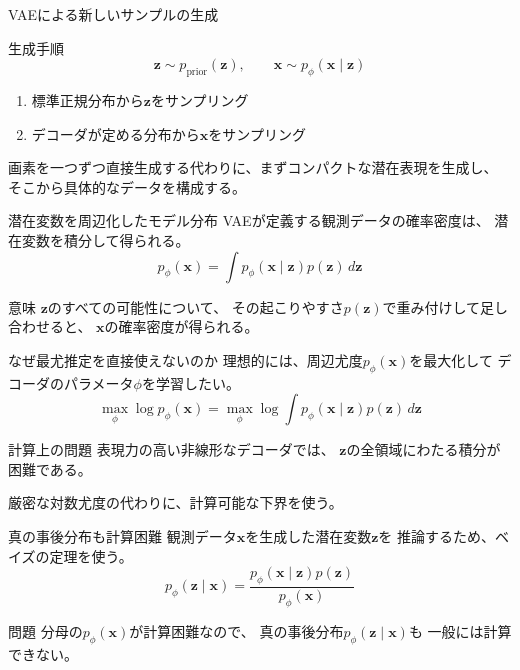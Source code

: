 \begin{frame}{VAEによる新しいサンプルの生成}
    \begin{block}{生成手順}
        \[
            \boldsymbol{z}\sim p_{\mathrm{prior}}(\boldsymbol{z}),
            \qquad
            \boldsymbol{x}\sim p_\phi(\boldsymbol{x}\mid\boldsymbol{z})
        \]
        \begin{enumerate}
            \item 標準正規分布から$\boldsymbol{z}$をサンプリング
            \item デコーダが定める分布から$\boldsymbol{x}$をサンプリング
        \end{enumerate}
    \end{block}
    \vspace{0.5em}
    画素を一つずつ直接生成する代わりに、まずコンパクトな潜在表現を生成し、
    そこから具体的なデータを構成する。
\end{frame}
\begin{frame}{潜在変数を周辺化したモデル分布}
    VAEが定義する観測データの確率密度は、
    潜在変数を積分して得られる。
    \[
        \boxed{
        p_\phi(\boldsymbol{x})
        =
        \int p_\phi(\boldsymbol{x}\mid\boldsymbol{z})
        p(\boldsymbol{z})\,d\boldsymbol{z}
        }
    \]
    \begin{exampleblock}{意味}
        $\boldsymbol{z}$のすべての可能性について、
        その起こりやすさ$p(\boldsymbol{z})$で重み付けして足し合わせると、
        $\boldsymbol{x}$の確率密度が得られる。
    \end{exampleblock}
\end{frame}
\begin{frame}{なぜ最尤推定を直接使えないのか}
    理想的には、周辺尤度$p_\phi(\boldsymbol{x})$を最大化して
    デコーダのパラメータ$\phi$を学習したい。
    \[
        \max_\phi\log p_\phi(\boldsymbol{x})
        =
        \max_\phi\log\int
        p_\phi(\boldsymbol{x}\mid\boldsymbol{z})
        p(\boldsymbol{z})\,d\boldsymbol{z}
    \]
    \begin{alertblock}{計算上の問題}
        表現力の高い非線形なデコーダでは、
        $\boldsymbol{z}$の全領域にわたる積分が困難である。
    \end{alertblock}
    厳密な対数尤度の代わりに、計算可能な下界を使う。
\end{frame}
\begin{frame}{真の事後分布も計算困難}
    観測データ$\boldsymbol{x}$を生成した潜在変数$\boldsymbol{z}$を
    推論するため、ベイズの定理を使う。
    \[
        p_\phi(\boldsymbol{z}\mid\boldsymbol{x})
        =
        \frac{
            p_\phi(\boldsymbol{x}\mid\boldsymbol{z})p(\boldsymbol{z})
        }{
            p_\phi(\boldsymbol{x})
        }
    \]
    \begin{alertblock}{問題}
        分母の$p_\phi(\boldsymbol{x})$が計算困難なので、
        真の事後分布$p_\phi(\boldsymbol{z}\mid\boldsymbol{x})$も
        一般には計算できない。
    \end{alertblock}
\end{frame}
